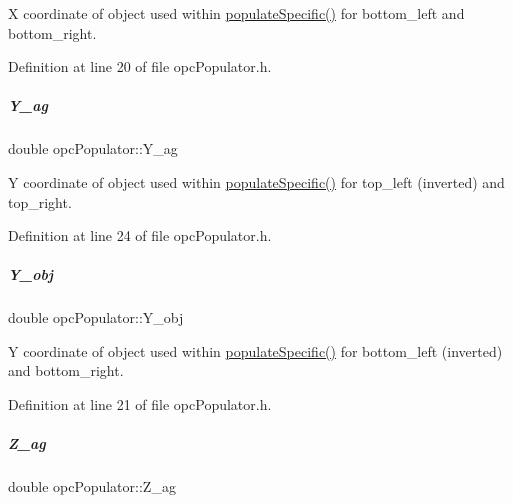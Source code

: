 X coordinate of object used within \hyperlink{group__opcPopulator_a0fba845edd63a15da94b864022d20ba3}{populate\+Specific()} for bottom\+\_\+left and bottom\+\_\+right. 



Definition at line 20 of file opc\+Populator.\+h.

\mbox{\label{group__opcPopulator_a1128329503e3c50b59dc0ad5f43a5719}} 
\subparagraph{\texorpdfstring{Y\+\_\+ag}{Y\_ag}}
{\footnotesize\ttfamily double opc\+Populator\+::\+Y\+\_\+ag\hspace{0.3cm}{\ttfamily [protected]}}



Y coordinate of object used within \hyperlink{group__opcPopulator_a0fba845edd63a15da94b864022d20ba3}{populate\+Specific()} for top\+\_\+left (inverted) and top\+\_\+right. 



Definition at line 24 of file opc\+Populator.\+h.

\mbox{\label{group__opcPopulator_afa134f43a94a563ea0be367d3bd956f7}} 
\subparagraph{\texorpdfstring{Y\+\_\+obj}{Y\_obj}}
{\footnotesize\ttfamily double opc\+Populator\+::\+Y\+\_\+obj\hspace{0.3cm}{\ttfamily [protected]}}



Y coordinate of object used within \hyperlink{group__opcPopulator_a0fba845edd63a15da94b864022d20ba3}{populate\+Specific()} for bottom\+\_\+left (inverted) and bottom\+\_\+right. 



Definition at line 21 of file opc\+Populator.\+h.

\mbox{\label{group__opcPopulator_a7538dcad96e0b3be0a930f3f85ab0708}} 
\subparagraph{\texorpdfstring{Z\+\_\+ag}{Z\_ag}}
{\footnotesize\ttfamily double opc\+Populator\+::\+Z\+\_\+ag\hspace{0.3cm}{\ttfamily [protected]}}



